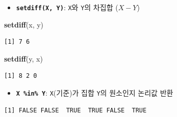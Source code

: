 \documentclass[
  11pt,
]{krantz}
\newenvironment{Shaded}{\begin{snugshade}}{\end{snugshade}}
\newcommand{\KeywordTok}[1]{\textcolor[rgb]{0.27,0.27,0.27}{\textbf{#1}}}
\newcommand{\NormalTok}[1]{#1}
\newcommand{\OperatorTok}[1]{\textcolor[rgb]{0.43,0.43,0.43}{\textbf{#1}}}
\newcommand{\StringTok}[1]{\textcolor[rgb]{0.5,0.5,0.5}{#1}}
\providecommand{\tightlist}{%
  \setlength{\itemsep}{0pt}\setlength{\parskip}{0pt}}
\begin{document}
\normalsize

\begin{itemize}
\tightlist
\item
  \textbf{\texttt{setdiff(X,\ Y)}}: \texttt{X}와 \texttt{Y}의 차집합 (\(X - Y\))
\end{itemize}

\footnotesize

\begin{Shaded}
\begin{Highlighting}[]
\KeywordTok{setdiff}\NormalTok{(x, y)}
\end{Highlighting}
\end{Shaded}

\begin{verbatim}
[1] 7 6
\end{verbatim}

\begin{Shaded}
\begin{Highlighting}[]
\KeywordTok{setdiff}\NormalTok{(y, x)}
\end{Highlighting}
\end{Shaded}

\begin{verbatim}
[1] 8 2 0
\end{verbatim}

\normalsize

\begin{itemize}
\tightlist
\item
  \textbf{\texttt{X\ \%in\%\ Y}}: \texttt{X}(기준)가 집합 \texttt{Y}의 원소인지 논리값 반환
\end{itemize}

\footnotesize

\begin{Shaded}
\end{Shaded}

\begin{verbatim}
[1] FALSE FALSE  TRUE  TRUE FALSE  TRUE
\end{verbatim}
\end{document}
